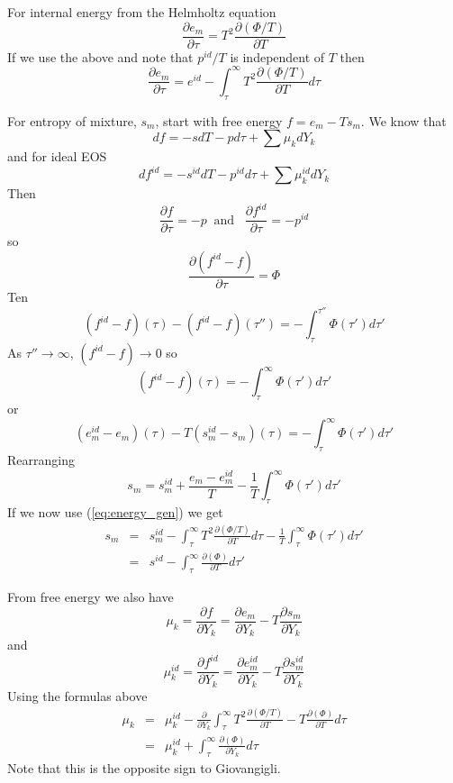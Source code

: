 \documentclass[11pt]{article}
\begin{document}
For internal energy from the Helmholtz equation
\begin{equation}
\frac{\partial e_m}{\partial \tau} = T^2 \frac{\partial (\Phi/T)} {\partial T}
\end{equation}
If we use the above and note that $p^{id}/T$ is independent of $T$ then
\begin{equation}
\frac{\partial e_m}{\partial \tau} = e^{id}- \int_\tau^\infty  T^2 \frac{\partial (\Phi/T)} {\partial T} d\tau
\label{eq:energy_gen}
\end{equation}

For entropy of mixture, $s_m$,
start with free energy $f = e_m - Ts_m$.
We know that
\[
df = -s dT - p d\tau + \sum \mu_k dY_k
\]
and for ideal EOS
\[
df^{id} = -s^{id} dT - p^{id} d\tau + \sum \mu_k^{id} dY_k
\]
Then
\begin{equation}
\frac{\partial f}{\partial \tau} = -p \;\; \mathrm{and} \;\;\;
\frac{\partial f^{id}}{\partial \tau} = -p^{id}
\end{equation}
so
\[
\frac{\partial (f^{id} - f)}{\partial \tau} = \Phi
\]
Ten
\begin{equation}
(f^{id} - f)(\tau) - 
(f^{id} - f)(\tau '' ) = -\int_\tau^{\tau ''} \Phi (\tau ')d\tau ' 
\end{equation}
As $\tau'' \rightarrow \infty$, $( f^{id}-f) \rightarrow 0$
so
\begin{equation}
(f^{id} - f)(\tau) 
 = -\int_\tau^{\infty} \Phi (\tau ')d\tau ' 
\end{equation}
or
\begin{equation}
(e_m^{id} - e_m)(\tau) - 
T(s_m^{id} - s_m)(\tau) 
 = -\int_\tau^{\infty} \Phi (\tau ')d\tau ' 
\end{equation}
Rearranging
\begin{equation}
s_m = s_m^{id} + \frac{e_m-e_m^{id}}{T} - \frac{1}{T}
\int_\tau^{\infty} \Phi (\tau ')d\tau ' 
\end{equation}
If we now use (\ref{eq:energy_gen})
we get
\begin{eqnarray}
s_m &=& s_m^{id} -
\int_\tau^\infty  T^2 \frac{\partial (\Phi/T)} {\partial T} d\tau
- \frac{1}{T}
\int_\tau^{\infty} \Phi (\tau ')d\tau '  \\
&=& s^{id}
-\int_\tau^{\infty} \frac{\partial (\Phi)} {\partial T} d\tau ' 
\end{eqnarray}

From free energy we also have
\[
\mu_k = \frac{\partial f}{\partial Y_k} = 
 \frac{\partial e_m}{\partial Y_k} - 
 T\frac{\partial s_m}{\partial Y_k} 
\]
and
\[
\mu_k^{id} = \frac{\partial f^{id}}{\partial Y_k} = 
 \frac{\partial e_m^{id}}{\partial Y_k} - 
 T\frac{\partial s_m^{id}}{\partial Y_k} 
\]
Using the formulas above
\begin{eqnarray}
\mu_k &=& \mu_k^{id} - \frac{\partial}{\partial Y_k} \int_\tau^\infty
 T^2 \frac{\partial (\Phi/T)} {\partial T} - T \frac{\partial (\Phi)} {\partial T} d\tau \\
 &=& \mu_k^{id} + \int_\tau^\infty \frac{\partial (\Phi)} {\partial Y_k} d\tau
\end{eqnarray}
Note that this is the opposite sign to Giovangigli.
\end{document}

